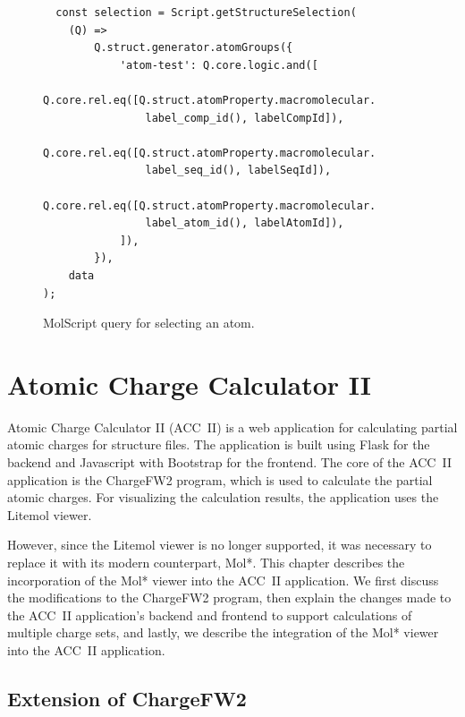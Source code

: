 \documentclass[
  digital,     %
  oneside,     %
  nosansbold,  %
  nocolorbold, %
  lof,         %
  lot,         %
]{fithesis4}
\begin{document}
\begin{figure}[htbp]
  \begin{verbatim}
  const selection = Script.getStructureSelection(
    (Q) =>
        Q.struct.generator.atomGroups({
            'atom-test': Q.core.logic.and([
                Q.core.rel.eq([Q.struct.atomProperty.macromolecular.
                label_comp_id(), labelCompId]),
                Q.core.rel.eq([Q.struct.atomProperty.macromolecular.
                label_seq_id(), labelSeqId]),
                Q.core.rel.eq([Q.struct.atomProperty.macromolecular.
                label_atom_id(), labelAtomId]),
            ]),
        }),
    data
);
\end{verbatim}
\caption{MolScript query for selecting an atom.}
\label{fig:focus}
\end{figure}

\newpage

\chapter{Atomic Charge Calculator II}
\label{chapter:atomic_charge_calculator_ii}

Atomic Charge Calculator II (ACC~II) is a web application for calculating partial atomic charges for structure files. The application is built using Flask for the backend and Javascript with Bootstrap for the frontend. The core of the ACC~II application is the ChargeFW2 program, which is used to calculate the partial atomic charges. For visualizing the calculation results, the application uses the Litemol viewer. \cite{racek2020acc2} 

However, since the Litemol viewer is no longer supported, it was necessary to replace it with its modern counterpart, Mol*. This chapter describes the incorporation of the Mol* viewer into the ACC~II application. We first discuss the modifications to the ChargeFW2 program, then explain the changes made to the ACC~II application's backend and frontend to support calculations of multiple charge sets, and lastly, we describe the integration of the Mol* viewer into the ACC~II application.

\section{Extension of ChargeFW2}
\label{section:chargefw2_extension}
\end{document}
